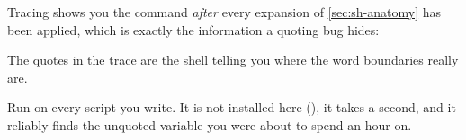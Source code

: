 \begin{eg}
	Tracing shows you the command \emph{after} every expansion of
	\autoref{sec:sh-anatomy} has been applied, which is exactly the information a
	quoting bug hides:
	The quotes in the trace are the shell telling you where the word boundaries
	really are.
\end{eg}

\begin{moral}
	Run  on every script you write. It is not installed here
	(), it takes a second, and it reliably finds the
	unquoted variable you were about to spend an hour on.
\end{moral}
